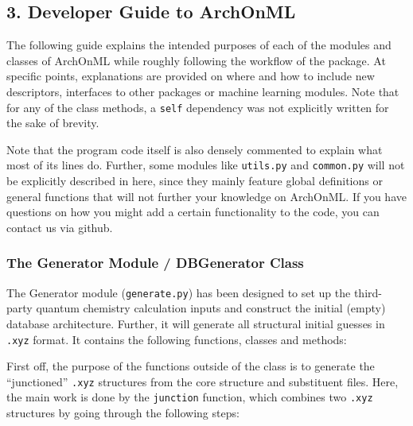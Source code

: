\documentclass[12pt]{achemso}
\begin{document}
\newpage
\subsection{3. Developer Guide to ArchOnML}

\noindent The following guide explains the intended purposes of each of the modules and classes of \linebreak ArchOnML while roughly following the workflow of the package. At specific points, explanations are provided on where and how to include new descriptors, interfaces to other packages or machine learning modules. Note that for any of the class methods, a \texttt{self} dependency was not explicitly written for the sake of brevity.

\noindent Note that the program code itself is also densely commented to explain what most of its lines do. Further, some modules like \texttt{utils.py} and \texttt{common.py} will not be explicitly described in here, since they mainly feature global definitions or general functions that will not further your knowledge on ArchOnML. If you have questions on how you might add a certain functionality to the code, you can contact us via github.

\subsubsection{The Generator Module / DBGenerator Class}

\noindent The Generator module (\texttt{generate.py}) has been designed to set up the third-party quantum chemistry calculation inputs and construct the initial (empty) database architecture. Further, it will generate all structural initial guesses in \texttt{.xyz} format. It contains the following functions, classes and methods:\\[-0.7em]

\vspace{1.0em}

\noindent First off, the purpose of the functions outside of the class is to generate the ``junctioned'' \texttt{.xyz} structures from the core structure and substituent files. Here, the main work is done by the \texttt{junction} function, which combines two \texttt{.xyz} structures by going through the following steps:
\end{document}
